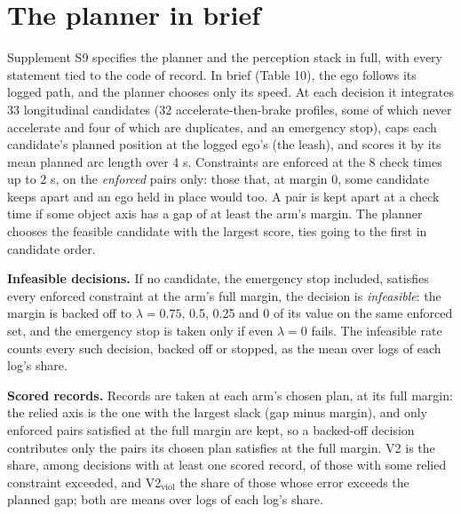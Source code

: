 \documentclass{ieeeaccess}
\begin{document}
\section{\break The planner in brief}
Supplement S9 specifies the planner and the perception stack in full, with every statement tied to the code of record. In brief (Table 10), the ego follows its logged path, and the planner chooses only its speed. At each decision it integrates 33 longitudinal candidates (32 accelerate-then-brake profiles, some of which never accelerate and four of which are duplicates, and an emergency stop), caps each candidate's planned position at the logged ego's (the leash), and scores it by its mean planned arc length over 4 s. Constraints are enforced at the 8 check times up to 2 s, on the \emph{enforced} pairs only: those that, at margin 0, some candidate keeps apart and an ego held in place would too. A pair is kept apart at a check time if some object axis has a gap of at least the arm's margin. The planner chooses the feasible candidate with the largest score, ties going to the first in candidate order.

\textbf{Infeasible decisions.} If no candidate, the emergency stop included, satisfies every enforced constraint at the arm's full margin, the decision is \emph{infeasible}: the margin is backed off to $\lambda = 0.75$, 0.5, 0.25 and 0 of its value on the same enforced set, and the emergency stop is taken only if even $\lambda = 0$ fails. The infeasible rate counts every such decision, backed off or stopped, as the mean over logs of each log's share.

\textbf{Scored records.} Records are taken at each arm's chosen plan, at its full margin: the relied axis is the one with the largest slack (gap minus margin), and only enforced pairs satisfied at the full margin are kept, so a backed-off decision contributes only the pairs its chosen plan satisfies at the full margin. V2 is the share, among decisions with at least one scored record, of those with some relied constraint exceeded, and V2$_{\mathrm{viol}}$ the share of those whose error exceeds the planned gap; both are means over logs of each log's share.
\end{document}
